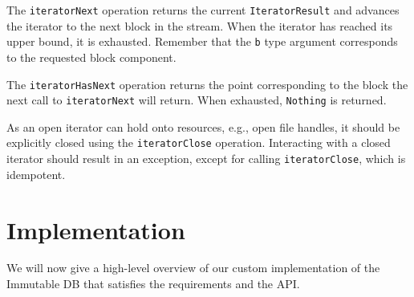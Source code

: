 The \lstinline!iteratorNext! operation returns the current
\lstinline!IteratorResult! and advances the iterator to the next block in the
stream. When the iterator has reached its upper bound, it is exhausted. Remember
that the \lstinline!b! type argument corresponds to the requested block
component.

The \lstinline!iteratorHasNext! operation returns the point corresponding to the
block the next call to \lstinline!iteratorNext! will return. When exhausted,
\lstinline!Nothing! is returned.

As an open iterator can hold onto resources, e.g., open file handles, it should
be explicitly closed using the \lstinline!iteratorClose! operation. Interacting
with a closed iterator should result in an exception, except for calling
\lstinline!iteratorClose!, which is idempotent.

\section{Implementation}
\label{immutable:implementation}

We will now give a high-level overview of our custom implementation of the
Immutable DB that satisfies the requirements and the API.

